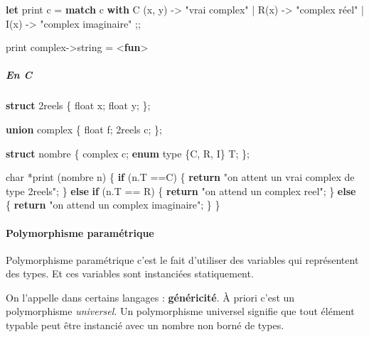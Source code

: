 \documentclass[]{article}
\newenvironment{Shaded}{}{}
\newcommand{\KeywordTok}[1]{\textcolor[rgb]{0.00,0.44,0.13}{\textbf{#1}}}
\newcommand{\DataTypeTok}[1]{\textcolor[rgb]{0.56,0.13,0.00}{#1}}
\newcommand{\StringTok}[1]{\textcolor[rgb]{0.25,0.44,0.63}{#1}}
\newcommand{\ControlFlowTok}[1]{\textcolor[rgb]{0.00,0.44,0.13}{\textbf{#1}}}
\newcommand{\NormalTok}[1]{#1}
\let\oldparagraph\paragraph
\renewcommand{\paragraph}[1]{\oldparagraph{#1}\mbox{}}
\let\oldsubparagraph\subparagraph
\renewcommand{\subparagraph}[1]{\oldsubparagraph{#1}\mbox{}}
\begin{document}
\begin{Shaded}
\begin{Highlighting}[]
\KeywordTok{let}\NormalTok{ print c = }\KeywordTok{match}\NormalTok{ c }\KeywordTok{with}\NormalTok{ C (x, y) -> }\StringTok{"vrai complex"}
\NormalTok{    | R(x) -> }\StringTok{"complex réel"}
\NormalTok{    | I(x) -> }\StringTok{"complex imaginaire"}\NormalTok{ ;;}

\NormalTok{print complex->}\DataTypeTok{string}\NormalTok{ = <}\KeywordTok{fun}\NormalTok{>}
\end{Highlighting}
\end{Shaded}

\subparagraph{En C}\label{en-c}

\begin{Shaded}
\begin{Highlighting}[]
\KeywordTok{struct}\NormalTok{ 2reels \{}
    \DataTypeTok{float}\NormalTok{ x;}
    \DataTypeTok{float}\NormalTok{ y;}
\NormalTok{\};}

\KeywordTok{union}\NormalTok{ complex \{}
    \DataTypeTok{float}\NormalTok{ f;}
\NormalTok{    2reels c;}
\NormalTok{\};}

\KeywordTok{struct}\NormalTok{ nombre \{}
\NormalTok{    complex c;}
    \KeywordTok{enum}\NormalTok{ type \{C, R, I\} T;}
\NormalTok{\};}

\DataTypeTok{char}\NormalTok{ *print (nombre n) \{}
    \ControlFlowTok{if}\NormalTok{ (n.T ==C) \{}
        \ControlFlowTok{return} \StringTok{"on attent un vrai complex de type 2reels"}\NormalTok{;}
\NormalTok{    \}}
    \ControlFlowTok{else} \ControlFlowTok{if}\NormalTok{ (n.T == R) \{}
        \ControlFlowTok{return} \StringTok{"on attend un complex reel"}\NormalTok{;}
\NormalTok{    \}}
    \ControlFlowTok{else}\NormalTok{ \{}
        \ControlFlowTok{return} \StringTok{"on attend un complex imaginaire"}\NormalTok{;}
\NormalTok{    \}}
\NormalTok{\}}
\end{Highlighting}
\end{Shaded}

\paragraph{Polymorphisme
paramétrique}\label{polymorphisme-paramuxe9trique}

Polymorphisme paramétrique c'est le fait d'utiliser des variables qui
représentent des types. Et ces variables sont instanciées statiquement.

On l'appelle dans certains langages : \textbf{généricité}. À priori
c'est un polymorphisme \emph{universel}. Un polymorphisme universel
signifie que tout élément typable peut être instancié avec un nombre non
borné de types.
\end{document}
